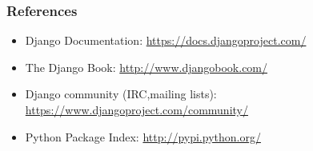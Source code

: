 \documentclass{beamer}
\begin{document}
\begin{frame}
  \frametitle{References}

  \begin{itemize}
    \item Django Documentation: \url{https://docs.djangoproject.com/}
    \item The Django Book: \url{http://www.djangobook.com/}
    \item Django community (IRC,mailing lists): \url{https://www.djangoproject.com/community/}
    \item Python Package Index: \url{http://pypi.python.org/}
  \end{itemize}

\end{frame}
\end{document}
